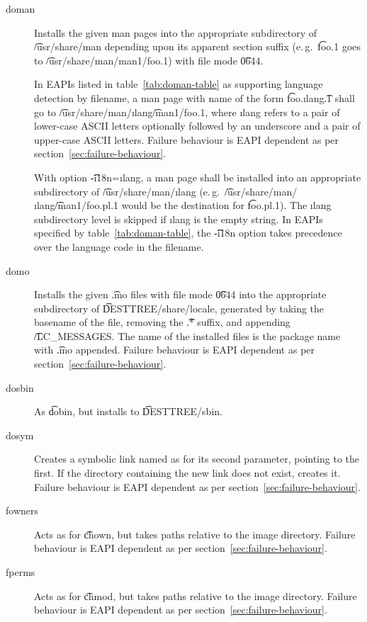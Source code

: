 \begin{description}
\item[doman] Installs the given man pages into the appropriate subdirectory of \t{/usr/share/man}
    depending upon its apparent section suffix (e.\,g.\ \t{foo.1} goes to
    \t{/usr/share/man/man1/foo.1}) with file mode \t{0644}.

     In EAPIs listed in table~\ref{tab:doman-table} as supporting
    language detection by filename, a man page with name of the form \t{foo.}\i{lang}\t{.1} shall
    go to \t{/usr/share/man/}\i{lang}\t{/man1/foo.1}, where \i{lang} refers to a pair of lower-case
    ASCII letters optionally followed by an underscore and a pair of upper-case ASCII letters.
    Failure behaviour is EAPI dependent as per section~\ref{sec:failure-behaviour}.

    With option \t{-i18n=}\i{lang}, a man page shall be installed into an appropriate subdirectory
    of \t{/usr/share/man/}\i{lang} (e.\,g.\ \t{/usr/share/man/}\i{lang}\t{/man1/foo.pl.1} would be
    the destination for \t{foo.pl.1}). The \i{lang} subdirectory level is skipped if \i{lang} is
    the empty string. In EAPIs specified by table~\ref{tab:doman-table}, the \t{-i18n} option takes
    precedence over the language code in the filename.

\item[domo] Installs the given \t{.mo} files with file mode \t{0644} into the appropriate
    subdirectory of \t{DESTTREE\slash share\slash locale}, generated by taking the basename of the
    file, removing the \t{.*} suffix, and appending \t{/LC_MESSAGES}\@. The name of the installed
    files is the package name with \t{.mo} appended. Failure behaviour is EAPI dependent as per
    section~\ref{sec:failure-behaviour}.

\item[dosbin] As \t{dobin}, but installs to \t{DESTTREE/sbin}.

\item[dosym] Creates a symbolic link named as for its second parameter, pointing to the first. If
    the directory containing the new link does not exist, creates it. Failure behaviour is EAPI
    dependent as per section~\ref{sec:failure-behaviour}.

\item[fowners] Acts as for \t{chown}, but takes paths relative to the image directory. Failure
    behaviour is EAPI dependent as per section~\ref{sec:failure-behaviour}.

\item[fperms] Acts as for \t{chmod}, but takes paths relative to the image directory. Failure
    behaviour is EAPI dependent as per section~\ref{sec:failure-behaviour}.


\end{description}
